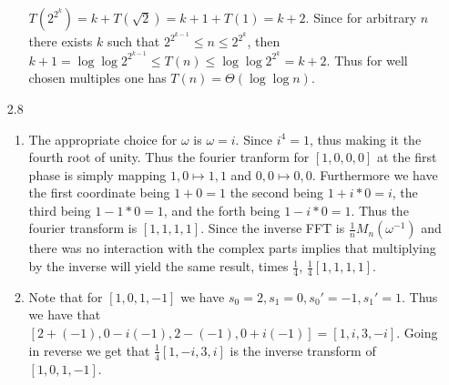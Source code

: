 \documentclass[12pt, letterpaper]{article}
\begin{document}
\begin{enumerate}
\begin{enumerate}
		$T(2^{2^k}) = k + T(\sqrt{2}) = k + 1 + T(1) = k + 2$.  
		Since for arbitrary $n$ there exists $k$ such that 
		$2^{2^{k-1}} \leq n \leq 2^{2^{k}}$, then 
		$k+1 = \log \log 2^{2^{k-1}} \leq T(n) \leq \log \log 2^{2^{k}} = k+2$.  Thus for well chosen multiples one has $T(n) = \Theta (\log \log n)$.  
	\end{enumerate}
	\item[2.8]
	\begin{enumerate}
		\item The appropriate choice for $\omega$ is $\omega = i$.  
		Since $i^4 = 1$, thus making it the fourth root of unity.  
		Thus the fourier tranform for $[1,0,0,0]$ at the first phase is
		simply mapping $1,0 \mapsto 1,1$ and $0,0 \mapsto 0,0$.  
		Furthermore we have the first coordinate being 
		$1 + 0 = 1$ the second being $1 + i*0 = i$, the third being
		$1 - 1 * 0 = 1$, and the forth being $1 - i * 0 = 1$.  Thus the fourier transform is 
		$[1,1,1,1]$.  Since the inverse FFT is $\frac{1}{n} M_n(\omega^{-1})$ and there was no interaction with the complex parts 
		implies that multiplying by the inverse will yield the same 
		result, times $\frac{1}{4}$, $\frac{1}{4}[1,1,1,1]$.
		\item Note that for $[1,0,1,-1]$ we have
		$s_0 = 2, s_1 = 0, s_0' = -1, s_1' = 1$. Thus we have 
		that $[2 +(-1), 0 - i (-1), 2 - (-1), 0 + i(-1)] = [1,i,3,-i]$.  Going in reverse we get that 
		$\frac{1}{4}[1,-i,3,i]$ is the inverse transform of 
		$[1,0,1,-1]$.  	
	\end{enumerate}
\end{enumerate}
\end{document}
